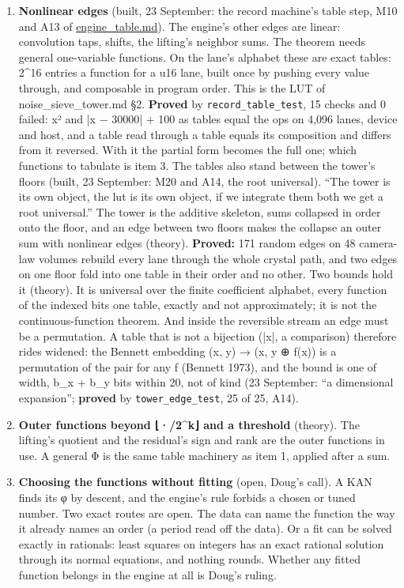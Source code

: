 \begin{enumerate}
\item \textbf{Nonlinear edges} (built, 23 September: the record machine's table step, M10 and A13 of \hyperref[chap:engine-table]{engine\_\allowbreak{}table.md}). The engine's other edges are linear: convolution taps, shifts, the lifting's neighbor sums. The theorem needs general one-variable functions. On the lane's alphabet these are exact tables: 2\textasciicircum{}16 entries a function for a u16 lane, built once by pushing every value through, and composable in program order. This is the LUT of noise\_\allowbreak{}sieve\_\allowbreak{}tower.md §2. \textbf{Proved} by \texttt{record\_\allowbreak{}table\_\allowbreak{}test}, 15 checks and 0 failed: x² and |x − 30000| + 100 as tables equal the ops on 4,096 lanes, device and host, and a table read through a table equals its composition and differs from it reversed. With it the partial form becomes the full one; which functions to tabulate is item 3. The tables also stand between the tower's floors (built, 23 September: M20 and A14, the root universal). “The tower is its own object, the lut is its own object, if we integrate them both we get a root universal.” The tower is the additive skeleton, sums collapsed in order onto the floor, and an edge between two floors makes the collapse an outer sum with nonlinear edges (theory). \textbf{Proved:} 171 random edges on 48 camera-law volumes rebuild every lane through the whole crystal path, and two edges on one floor fold into one table in their order and no other. Two bounds hold it (theory). It is universal over the finite coefficient alphabet, every function of the indexed bits one table, exactly and not approximately; it is not the continuous-function theorem. And inside the reversible stream an edge must be a permutation. A table that is not a bijection (|x|, a comparison) therefore rides widened: the Bennett embedding (x, y) → (x, y ⊕ f(x)) is a permutation of the pair for any f (Bennett 1973), and the bound is one of width, b\_\allowbreak{}x + b\_\allowbreak{}y bits within 20, not of kind (23 September: “a dimensional expansion”; \textbf{proved} by \texttt{tower\_\allowbreak{}edge\_\allowbreak{}test}, 25 of 25, A14).
\item \textbf{Outer functions beyond ⌊·/2\textasciicircum{}k⌋ and a threshold} (theory). The lifting's quotient and the residual's sign and rank are the outer functions in use. A general Φ is the same table machinery as item 1, applied after a sum.
\item \textbf{Choosing the functions without fitting} (open, Doug's call). A KAN finds its φ by descent, and the engine's rule forbids a chosen or tuned number. Two exact routes are open. The data can name the function the way it already names an order (a period read off the data). Or a fit can be solved exactly in rationals: least squares on integers has an exact rational solution through its normal equations, and nothing rounds. Whether any fitted function belongs in the engine at all is Doug's ruling.

\end{enumerate}
